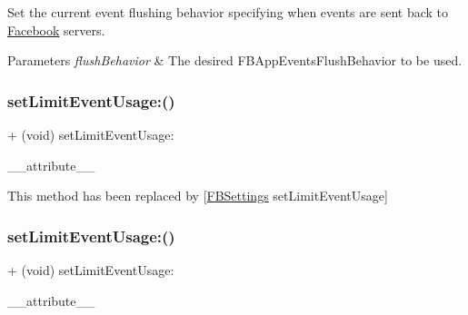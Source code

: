 Set the current event flushing behavior specifying when events are sent back to \hyperlink{interfaceFacebook}{Facebook} servers.


\begin{DoxyParams}{Parameters}
{\em flush\+Behavior} & The desired {\ttfamily F\+B\+App\+Events\+Flush\+Behavior} to be used. \\
\hline
\end{DoxyParams}
\mbox{\label{interfaceFBAppEvents_a35ba571c101d4c2a051583f59ad433ab}} 
\subsubsection{\texorpdfstring{set\+Limit\+Event\+Usage\+:()}{setLimitEventUsage:()}\hspace{0.1cm}{\footnotesize\ttfamily [1/5]}}
{\footnotesize\ttfamily + (void) set\+Limit\+Event\+Usage\+: \begin{DoxyParamCaption}\item[{((deprecated(\char`\"{}use \mbox{[}\hyperlink{interfaceFBSettings}{F\+B\+Settings} set\+Limit\+Event\+And\+Data\+Usage\mbox{]} instead\char`\"{})))}]{\+\_\+\+\_\+attribute\+\_\+\+\_\+ }\end{DoxyParamCaption}}

This method has been replaced by \mbox{[}\hyperlink{interfaceFBSettings}{F\+B\+Settings} set\+Limit\+Event\+Usage\mbox{]} \mbox{\label{interfaceFBAppEvents_a35ba571c101d4c2a051583f59ad433ab}} 
\subsubsection{\texorpdfstring{set\+Limit\+Event\+Usage\+:()}{setLimitEventUsage:()}\hspace{0.1cm}{\footnotesize\ttfamily [2/5]}}
{\footnotesize\ttfamily + (void) set\+Limit\+Event\+Usage\+: \begin{DoxyParamCaption}\item[{((deprecated(\char`\"{}use \mbox{[}\hyperlink{interfaceFBSettings}{F\+B\+Settings} set\+Limit\+Event\+And\+Data\+Usage\mbox{]} instead\char`\"{})))}]{\+\_\+\+\_\+attribute\+\_\+\+\_\+ }\end{DoxyParamCaption}}

